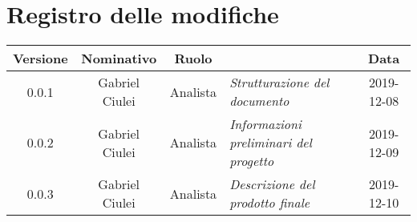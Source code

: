 \section*{Registro delle modifiche}
\renewcommand{\arraystretch}{1.8}
  
  \begin{longtable}{|c|c|c|p{3.8cm}|c|}
    \hline
    
    \rowcolor{header}
    \textbf{Versione} & \textbf{Nominativo} & \textbf{Ruolo} & \centering{\textbf{Descrizione}} & \textbf{Data}\\
    
     \hline
    
    0.0.1 & Gabriel Ciulei & Analista & \small{\textit{Strutturazione del documento}} & 2019-12-08\\
    
    \hline
    
    0.0.2 & Gabriel Ciulei & Analista & \small{\textit{Informazioni preliminari del progetto}} & 2019-12-09\\
    
    \hline
    
    0.0.3 & Gabriel Ciulei & Analista & \small{\textit{Descrizione del prodotto finale}} & 2019-12-10\\
    
    \hline
  \end{longtable}